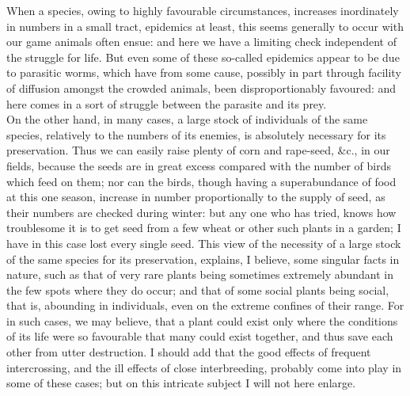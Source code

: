\indent When a species, owing to highly favourable circumstances, increases inordinately in numbers in a small tract, epidemics at least, this seems generally to occur with our game animals often ensue: and here we have a limiting check independent of the struggle for life. But even some of these so-called epidemics appear to be due to parasitic worms, which have from some cause, possibly in part through facility of diffusion amongst the crowded animals, been disproportionably favoured: and here comes in a sort of struggle between the parasite and its prey.\\
\indent On the other hand, in many cases, a large stock of individuals of the same species, relatively to the numbers of its enemies, is absolutely necessary for its preservation. Thus we can easily raise plenty of corn and rape-seed, \&c., in our fields, because the seeds are in great excess compared with the number of birds which feed on them; nor can the birds, though having a superabundance of food at this one season, increase in number proportionally to the supply of seed, as their numbers are checked during winter: but any one who has tried, knows how troublesome it is to get seed from a few wheat or other such plants in a garden; I have in this case lost every single seed. This view of the necessity of a large stock of the same species for its preservation, explains, I believe, some singular facts in nature, such as that of very rare plants being sometimes extremely abundant in the few spots where they do occur; and that of some social plants being social, that is, abounding in individuals, even on the extreme confines of their range. For in such cases, we may believe, that a plant could exist only where the conditions of its life were so favourable that many could exist together, and thus save each other from utter destruction. I should add that the good effects of frequent intercrossing, and the ill effects of close interbreeding, probably come into play in some of these cases; but on this intricate subject I will not here enlarge.\\
